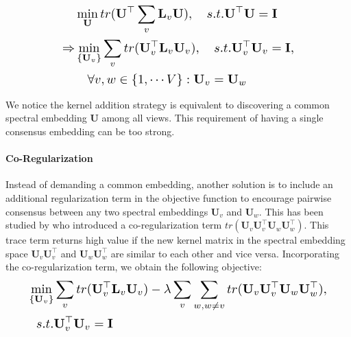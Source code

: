 \documentclass[10pt,twocolumn,letterpaper]{article}
\newcommand{\vect}[1]{\mathbf{#1}}
\newcommand{\matr}[1]{\mathbf{#1}}
\begin{document}
\vspace{-0.2cm}
\begin{equation}
  \resizebox{0.7\linewidth}{!}{$
\begin{split}
&\min\limits_{\matr{U}} tr(\vect{U}^\top\sum_v\matr{L}_v\vect{U}),\quad s.t. \vect{U}^\top\vect{U}=\matr{I}\\
\Rightarrow &\min\limits_{\{\matr{U}_v\}} \sum_v tr(\vect{U}_v^\top\matr{L}_v\vect{U}_v),\quad s.t. \vect{U}_v^\top\vect{U}_v=\matr{I}, \\
&\quad \forall v,w\in\{1,\cdots V\}: \vect{U}_v=\vect{U}_w
\end{split}$}
\end{equation}

 We notice the kernel addition strategy is equivalent to discovering a common spectral embedding $\matr{U}$ among all views. This requirement of having a single consensus embedding can be too strong.

\vspace{-0.2cm}
 \paragraph{Co-Regularization} Instead of demanding a common embedding, another solution is to include an additional regularization term in the objective function to encourage pairwise consensus between any two spectral embeddings $\matr{U}_v$ and $\matr{U}_w$. This has been studied by \cite{Kumar2011} who introduced a co-regularization term $tr\left(\matr{U}_v\matr{U}_v^\top\matr{U}_w\matr{U}_w^\top\right)$. This trace term returns high value if the new kernel matrix in the spectral embedding space $\matr{U}_v\matr{U}_v^\top$ and $\matr{U}_w\matr{U}_w^\top$ are similar to each other and vice versa. Incorporating the co-regularization term, we obtain the following objective:
\vspace{-0.0cm}
\begin{equation}\label{eq:CoRegObj}
  \resizebox{0.9\linewidth}{!}{$
\begin{split}
\min_{\{\matr{U}_v\}} &\sum_v tr(\vect{U}_v^\top\matr{L}_v\vect{U}_v)-\lambda\sum_v\sum_{w,w\neq v}tr(\matr{U}_v\matr{U}_v^\top\matr{U}_w\matr{U}_w^\top),\\
s.t. &\vect{U}_v^\top\vect{U}_v=\matr{I}\\
\end{split}$}
\end{equation}
\end{document}
